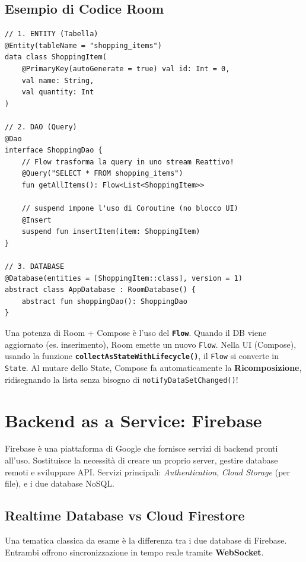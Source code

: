 \subsection{Esempio di Codice Room}
\begin{lstlisting}[caption={I tre componenti di Room}]
// 1. ENTITY (Tabella)
@Entity(tableName = "shopping_items")
data class ShoppingItem(
    @PrimaryKey(autoGenerate = true) val id: Int = 0,
    val name: String,
    val quantity: Int
)

// 2. DAO (Query)
@Dao
interface ShoppingDao {
    // Flow trasforma la query in uno stream Reattivo!
    @Query("SELECT * FROM shopping_items")
    fun getAllItems(): Flow<List<ShoppingItem>>

    // suspend impone l'uso di Coroutine (no blocco UI)
    @Insert
    suspend fun insertItem(item: ShoppingItem)
}

// 3. DATABASE
@Database(entities = [ShoppingItem::class], version = 1)
abstract class AppDatabase : RoomDatabase() {
    abstract fun shoppingDao(): ShoppingDao
}
\end{lstlisting}

\begin{tcolorbox}[colback=blue!5!white,colframe=blue!75!black,title=Da Flow a UI Reattiva in Compose]
    Una potenza di Room + Compose è l'uso del \textbf{\texttt{Flow}}.
    Quando il DB viene aggiornato (es.
    inserimento), Room emette un nuovo \texttt{Flow}.
    Nella UI (Compose), usando la funzione \textbf{\texttt{collectAsStateWithLifecycle()}}, il \texttt{Flow} si converte in \texttt{State}.
    Al mutare dello State, Compose fa automaticamente la \textbf{Ricomposizione}, ridisegnando la lista senza bisogno di \texttt{notifyDataSetChanged()}!
\end{tcolorbox}

\section{Backend as a Service: Firebase}
Firebase è una piattaforma di Google che fornisce servizi di backend pronti all'uso.
Sostituisce la necessità di creare un proprio server, gestire database remoti e sviluppare API. Servizi principali: \textit{Authentication}, \textit{Cloud Storage} (per file), e i due database NoSQL.

\subsection{Realtime Database vs Cloud Firestore}
Una tematica classica da esame è la differenza tra i due database di Firebase.
Entrambi offrono sincronizzazione in tempo reale tramite \textbf{WebSocket}.

